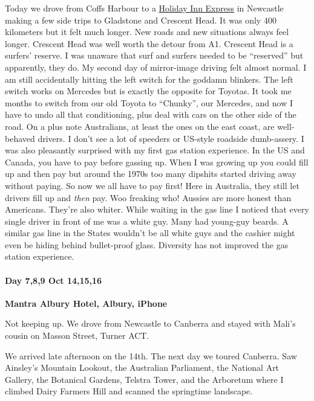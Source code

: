 Today we drove from Coffs Harbour to a
\href{https://www.ihg.com/holidayinnexpress/hotels/us/en/newcastle/ntlnc/hoteldetail}{Holiday
Inn Express} in Newcastle making a few side trips to Gladstone and
Crescent Head. It was only 400 kilometers but it felt much longer. New
roads and new situations always feel longer. Crescent Head was well
worth the detour from A1. Crescent Head is a surfers' reserve. I was
unaware that surf and surfers needed to be ``reserved'' but apparently,
they do. My second day of mirror-image driving felt almost normal. I am
still accidentally hitting the left switch for the goddamn blinkers. The
left switch works on Mercedes but is exactly the opposite for Toyotas.
It took me months to switch from our old Toyota to ``Chunky'', our
Mercedes, and now I have to undo all that conditioning, plus deal with
cars on the other side of the road. On a plus note Australians, at least
the ones on the east coast, are well-behaved drivers. I don't see a lot
of speeders or US-style roadside dumb-assery. I was also pleasantly
surprised with my first gas station experience. In the US and Canada,
you have to pay before gassing up. When I was growing up you could fill
up and then pay but around the 1970s too many dipshits started driving
away without paying. So now we all have to pay first! Here in Australia,
they still let drivers fill up and \textit{then} pay. Woo freaking who! Aussies are
more honest than Americans. They're also whiter. While waiting in the
gas line I noticed that every single driver in front of me was a white
guy. Many had young-guy beards. A similar gas line in the States
wouldn't be all white guys and the cashier might even be hiding behind
bullet-proof glass. Diversity has not improved the gas station
experience.

\hypertarget{day-789-oct-141516}{%
\paragraph{\texorpdfstring{\textbf{Day 7,8,9 Oct
14,15,16}}{Day 7,8,9 Oct 14,15,16}}\label{day-789-oct-141516}}

\textbf{Mantra Albury Hotel, Albury, iPhone}

Not keeping up. We drove from Newcastle to Canberra and stayed with
Mali's cousin on Masson Street, Turner ACT.

We arrived late afternoon on the 14th. The next day we toured Canberra.
Saw Ainsley's Mountain Lookout, the Australian Parliament, the National
Art Gallery, the Botanical Gardens, Telstra Tower, and the Arboretum
where I climbed Dairy Farmers Hill and scanned the springtime landscape.

